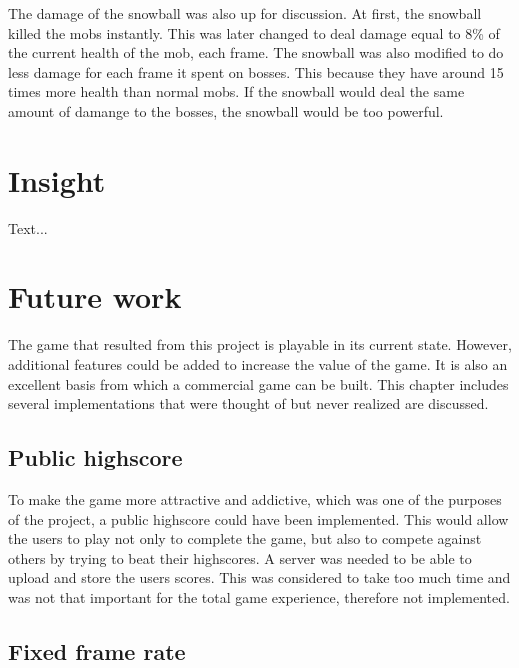 The damage of the snowball was also up for discussion. At first, the snowball killed the mobs instantly. This was later changed to deal damage equal to 8\% of the current health of the mob, each frame. The snowball was also modified to do less damage for each frame it spent on bosses. This because they have around 15 times more health than normal mobs. If the snowball would deal the same amount of damange to the bosses, the snowball would be too powerful.
\section{Insight} %

Text...
\section{Future work}

The game that resulted from this project is playable in its current state. However, additional features could be added to increase the value of the game. It is also an excellent basis from which a commercial game can be built. This chapter includes several implementations that were thought of but never realized are discussed.

\subsection{Public highscore}

To make the game more attractive and addictive, which was one of the purposes of the project, a public highscore could have been implemented. This would allow the users to play not only to complete the game, but also to compete against others by trying to beat their highscores. A server was needed to be able to upload and store the users scores. This was considered to take too much time and was not that important for the total game experience, therefore not implemented.
\subsection{Fixed frame rate}

